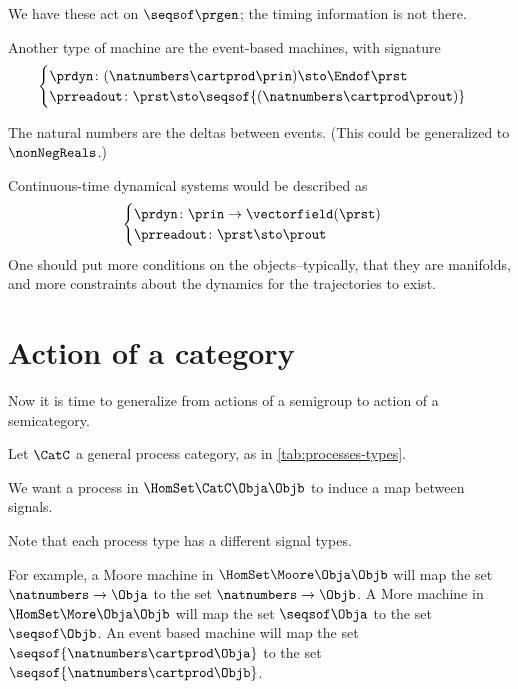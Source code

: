 We have these act on $\seqsof \prgen$; the timing information is not there.

Another type of machine are the event-based machines, with signature 
\begin{equation*}
  \begin{cases}
    \prdyn \colon (\natnumbers \cartprod \prin) \sto \Endof \prst \\
    \prreadout \colon \prst \sto \seqsof{ (\natnumbers \cartprod \prout)}
    \end{cases}    
\end{equation*}

The natural numbers are the deltas between events. (This could be generalized to $\nonNegReals$.)

Continuous-time dynamical systems would be described as 
% 
\begin{equation}
\begin{cases}
  \prdyn\colon \prin \to \vectorfield(\prst) \\
\prreadout\colon \prst \sto   \prout
\end{cases}
\end{equation}
% 
One should put more conditions on the objects--typically, that they are manifolds, and more constraints about the dynamics for the trajectories to exist.



\section{Action of a category}

Now it is time to generalize from actions of a semigroup to action of a semicategory. 

Let $\CatC$ a general process category, as in \cref{tab:processes-types}.

We want a process in $\HomSet\CatC\Obja\Objb$ to induce a map between signals. 

Note that each process type has a different signal types. 

For example, a Moore machine in $\HomSet\Moore\Obja\Objb$ will map the set $\natnumbers \to \Obja$ to the set $\natnumbers \to \Objb$. 
A More machine in  $\HomSet\More\Obja\Objb$  will map the set  $\seqsof \Obja$ to the set $\seqsof \Objb$. 
An event based machine will map the set  $\seqsof{\natnumbers \cartprod \Obja}$ to the set $\seqsof{\natnumbers \cartprod \Objb}$.

